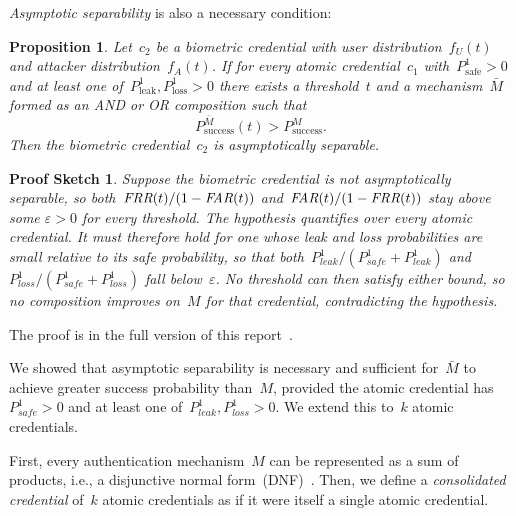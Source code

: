 \documentclass[conference,compsoc]{IEEEtran}
\newtheorem{proposition}{Proposition}
\newtheorem*{proofsketch}{Proof Sketch}
\begin{document}
\emph{Asymptotic separability} is also a necessary condition:
\begin{proposition}\label{thm:nec_cond_for_improve}
    Let~$c_2$ be a biometric credential with user distribution~$f_U(t)$ and attacker distribution~$f_A(t)$. If for every atomic credential~$c_1$ with~$P^1_\text{safe} > 0$ and at least one of~$P^1_\text{leak},P^1_\text{loss} > 0$ there exists a threshold~$t$ and a mechanism~$\bar{M}$ formed as an \emph{AND} or \emph{OR} composition such that
    \begin{equation*}
    P^{\bar{M}}_{\text{success}}(t) > P^{M}_{\text{success}}.
    \end{equation*}
    Then the biometric credential~$c_2$ is asymptotically separable.
\end{proposition} 
\noindent
\begin{proofsketch}
Suppose the biometric credential is not asymptotically separable, so both~$\textit{FRR}(t)/(1-\textit{FAR}(t))$ and~$\textit{FAR}(t)/(1-\textit{FRR}(t))$ stay above some $\varepsilon > 0$ for every threshold.
The hypothesis quantifies over \emph{every} atomic credential. It must therefore hold for one whose leak and loss probabilities are small relative to its safe probability, so that both~$P^1_{leak}/(P^1_{safe}+P^1_{leak})$ and~$P^1_{loss}/(P^1_{safe}+P^1_{loss})$ fall below~$\varepsilon$.
No threshold can then satisfy either bound, so no composition improves on~$M$ for that credential, contradicting the hypothesis.
\end{proofsketch}
\noindent
The proof is in the full version of this report~\cite{biometric_full_version}.

We showed that asymptotic separability is necessary and sufficient for~$\bar{M}$ to achieve greater success probability than~$M$, provided the atomic credential has~$P^1_{safe} > 0$ and at least one of~$P^1_{leak}, P^1_{loss} > 0$.
We extend this to~$k$ atomic credentials.

First, every authentication mechanism~$M$ can be represented as a sum of products, i.e., a disjunctive normal form~(DNF)~\cite{Mendelson1997}. Then, we define a \emph{consolidated credential} of~$k$ atomic credentials as if it were itself a single atomic credential.
\end{document}
